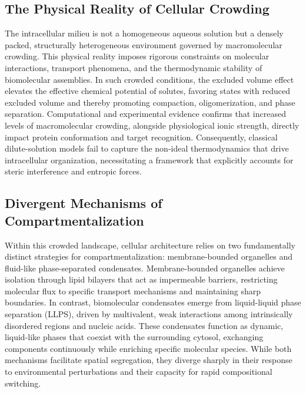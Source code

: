 \documentclass[conference]{IEEEtran}
\begin{document}
\subsection{The Physical Reality of Cellular Crowding}
The intracellular milieu is not a homogeneous aqueous solution but a densely packed, structurally heterogeneous environment governed by macromolecular crowding. This physical reality imposes rigorous constraints on molecular interactions, transport phenomena, and the thermodynamic stability of biomolecular assemblies. In such crowded conditions, the excluded volume effect elevates the effective chemical potential of solutes, favoring states with reduced excluded volume and thereby promoting compaction, oligomerization, and phase separation. Computational and experimental evidence confirms that increased levels of macromolecular crowding, alongside physiological ionic strength, directly impact protein conformation and target recognition. Consequently, classical dilute-solution models fail to capture the non-ideal thermodynamics that drive intracellular organization, necessitating a framework that explicitly accounts for steric interference and entropic forces.~\cite{cite_42ed299a53990c06,cite_8d46403814b99258}

\subsection{Divergent Mechanisms of Compartmentalization}
Within this crowded landscape, cellular architecture relies on two fundamentally distinct strategies for compartmentalization: membrane-bounded organelles and fluid-like phase-separated condensates. Membrane-bounded organelles achieve isolation through lipid bilayers that act as impermeable barriers, restricting molecular flux to specific transport mechanisms and maintaining sharp boundaries. In contrast, biomolecular condensates emerge from liquid-liquid phase separation (LLPS), driven by multivalent, weak interactions among intrinsically disordered regions and nucleic acids. These condensates function as dynamic, liquid-like phases that coexist with the surrounding cytosol, exchanging components continuously while enriching specific molecular species. While both mechanisms facilitate spatial segregation, they diverge sharply in their response to environmental perturbations and their capacity for rapid compositional switching.~\cite{cite_7161cfcb40366dd0,cite_afcca09a0a820cb3}
\end{document}
